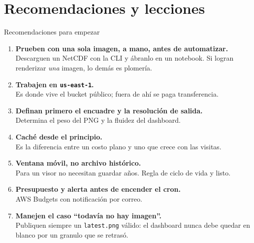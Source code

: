 \documentclass[10pt,aspectratio=169]{beamer}
\begin{document}
\section{Recomendaciones y lecciones}

\begin{frame}{Recomendaciones para empezar}
  \begin{enumerate}
    \item \textbf{Prueben con una sola imagen, a mano, antes de automatizar.}\\
          \small Descarguen un NetCDF con la CLI y ábranlo en un notebook.
          Si logran renderizar \emph{una} imagen, lo demás es plomería.
    \item \textbf{Trabajen en \texttt{us-east-1}.}\\
          \small Es donde vive el bucket público; fuera de ahí se paga transferencia.
    \item \textbf{Definan primero el encuadre y la resolución de salida.}\\
          \small Determina el peso del PNG y la fluidez del dashboard.
    \item \textbf{Caché desde el principio.}\\
          \small Es la diferencia entre un costo plano y uno que crece con las visitas.
    \item \textbf{Ventana móvil, no archivo histórico.}\\
          \small Para un visor no necesitan guardar años. Regla de ciclo de vida y listo.
    \item \textbf{Presupuesto y alerta antes de encender el cron.}\\
          \small AWS Budgets con notificación por correo.
    \item \textbf{Manejen el caso ``todavía no hay imagen''.}\\
          \small Publiquen siempre un \texttt{latest.png} válido: el dashboard nunca
          debe quedar en blanco por un granulo que se retrasó.
  \end{enumerate}
\end{frame}
\end{document}
